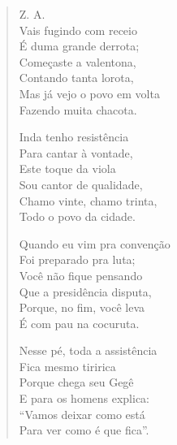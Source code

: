 \begin{verse}
Z. A.\\
Vais fugindo com receio\\
É duma grande derrota;\\
Começaste a valentona, \\
Contando tanta lorota,\\
Mas já vejo o povo em volta\\
Fazendo muita chacota.

Inda tenho resistência\\
Para cantar à vontade,\\
Este toque da viola\\
Sou cantor de qualidade,\\
Chamo vinte, chamo trinta,\\
Todo o povo da cidade.

Quando eu vim pra convenção\\
Foi preparado pra luta;\\
Você não fique pensando\\
Que a presidência disputa,\\
Porque, no fim, você leva\\
É com pau na cocuruta.

Nesse pé, toda a assistência\\
Fica mesmo tiririca\\
Porque chega seu Gegê\\
E para os homens explica:\\
“Vamos deixar como está\\
Para ver como é que fica”.
\end{verse}

